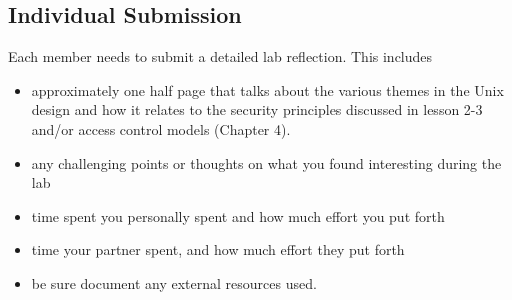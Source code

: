 \documentclass{article}
\begin{document}
\subsection{Individual Submission}
Each member needs to submit a detailed lab reflection. This includes 
\begin{itemize}
\item approximately one half page that talks about the various themes in the Unix design and how it relates to the security principles discussed in lesson 2-3 and/or access control models (Chapter 4). 
\item any challenging points or thoughts on what you found interesting during the lab 
\item time spent you personally spent and how much effort you put forth
\item time your partner spent, and how much effort they put forth
\item be sure document any external resources used. 
\end{itemize}
\end{document}
